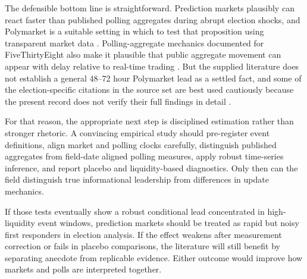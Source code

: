 \documentclass[11pt]{article}
\begin{document}
The defensible bottom line is straightforward. Prediction markets plausibly can react faster than published polling aggregates during abrupt election shocks, and Polymarket is a suitable setting in which to test that proposition using transparent market data \citep{predictionmarkets2004aeaweb, introductionpolymandpolymark}. Polling-aggregate mechanics documented for FiveThirtyEight also make it plausible that public aggregate movement can appear with delay relative to real-time trading \citep{howourpollingavera2023fivethir}. But the supplied literature does not establish a general 48--72 hour Polymarket lead as a settled fact, and some of the election-specific citations in the source set are best used cautiously because the present record does not verify their full findings in detail \citep{informationflowbet2018ideas, marketsvspollsasel2000scienced}.

For that reason, the appropriate next step is disciplined estimation rather than stronger rhetoric. A convincing empirical study should pre-register event definitions, align market and polling clocks carefully, distinguish published aggregates from field-date aligned polling measures, apply robust time-series inference, and report placebo and liquidity-based diagnostics. Only then can the field distinguish true informational leadership from differences in update mechanics.

If those tests eventually show a robust conditional lead concentrated in high-liquidity event windows, prediction markets should be treated as rapid but noisy first responders in election analysis. If the effect weakens after measurement correction or fails in placebo comparisons, the literature will still benefit by separating anecdote from replicable evidence. Either outcome would improve how markets and polls are interpreted together.



\end{document}
